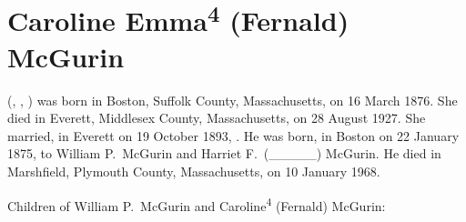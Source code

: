 \section{Caroline Emma\textsuperscript{4} (Fernald) McGurin}

 (, , ) was born in Boston, Suffolk County, Massachusetts, on 16 March 1876.\cite{Caroline4FernaldBirth} She died in Everett, Middlesex County, Massachusetts, on 28 August 1927.\cite{Caroline4FernaldDeath} She married, in Everett on 19 October 1893, . He was born, in Boston on 22 January 1875, to William P.\ McGurin and Harriet F.\ (\_\_\_\_\_) McGurin.\cite{JohnMcGurinBirth} He died in Marshfield, Plymouth County, Massachusetts, on 10 January 1968.\cite{JohnMcGurinDeath}

\begin{KidsIntro}
	Children of William P.\ McGurin and Caroline\textsuperscript{4} (Fernald) McGurin:
\end{KidsIntro}

